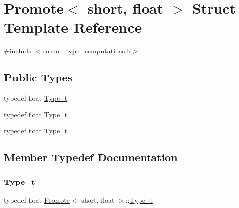\hypertarget{structPromote_3_01short_00_01float_01_4}{}\section{Promote$<$ short, float $>$ Struct Template Reference}
\label{structPromote_3_01short_00_01float_01_4}


{\ttfamily \#include $<$ensem\+\_\+type\+\_\+computations.\+h$>$}

\subsection*{Public Types}
\begin{DoxyCompactItemize}
\item 
typedef float \mbox{\hyperlink{structPromote_3_01short_00_01float_01_4_a6c280bd9d625add9fbe42ad7517e59d7}{Type\+\_\+t}}
\item 
typedef float \mbox{\hyperlink{structPromote_3_01short_00_01float_01_4_a6c280bd9d625add9fbe42ad7517e59d7}{Type\+\_\+t}}
\item 
typedef float \mbox{\hyperlink{structPromote_3_01short_00_01float_01_4_a6c280bd9d625add9fbe42ad7517e59d7}{Type\+\_\+t}}
\end{DoxyCompactItemize}


\subsection{Member Typedef Documentation}
\mbox{\label{structPromote_3_01short_00_01float_01_4_a6c280bd9d625add9fbe42ad7517e59d7}} 
\subsubsection{\texorpdfstring{Type\_t}{Type\_t}\hspace{0.1cm}{\footnotesize\ttfamily [1/3]}}
{\footnotesize\ttfamily typedef float \mbox{\hyperlink{structPromote}{Promote}}$<$ short, float $>$\+::\mbox{\hyperlink{structPromote_3_01short_00_01float_01_4_a6c280bd9d625add9fbe42ad7517e59d7}{Type\+\_\+t}}}

\mbox{\label{structPromote_3_01short_00_01float_01_4_a6c280bd9d625add9fbe42ad7517e59d7}} 
